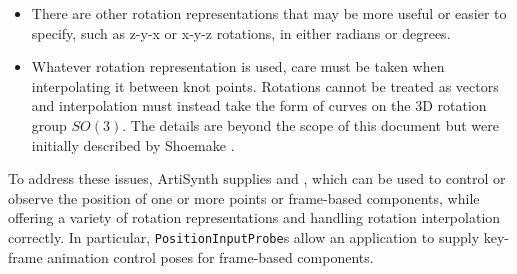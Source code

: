 \begin{itemize}

\item There are other rotation representations that may be more
useful or easier to specify, such as z-y-x or x-y-z rotations,
in either radians or degrees.

\item Whatever rotation representation is used, care must be taken
when interpolating it between knot points. Rotations cannot be treated as
vectors and interpolation must instead take the form of curves on the 3D
rotation group $SO(3)$. The details are beyond the scope of this document but
were initially described by Shoemake \cite{shoemake1985animating}.

\end{itemize}

To address these issues, ArtiSynth supplies
 and
, which can be used to control or
observe the position of one or more points or frame-based components, while
offering a variety of rotation representations and handling rotation
interpolation correctly. In particular, {\tt PositionInputProbe}s
allow an application to supply key-frame animation control poses for
frame-based components.

